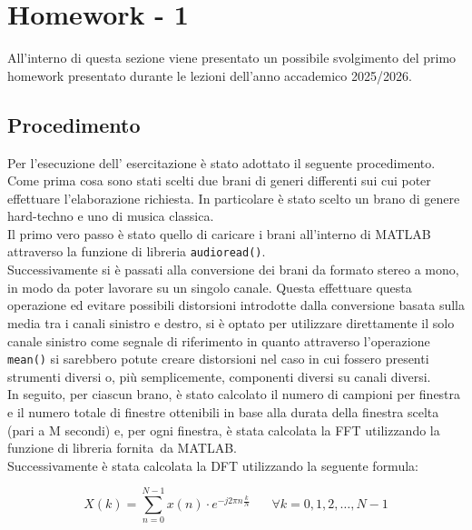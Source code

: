 \documentclass[../main.tex]{subfiles}
\begin{document}
\clearpage
\thispagestyle{empty}
\vspace*{7cm}
\section{Homework - 1}
\vspace*{1.5cm}

All'interno di questa sezione viene presentato un possibile svolgimento del primo homework presentato durante le lezioni dell'anno accademico 2025/2026.

\subsection{Procedimento}

Per l'esecuzione dell' esercitazione è stato adottato il seguente procedimento.
Come prima cosa sono stati scelti due brani di generi differenti sui cui poter effettuare l'elaborazione richiesta. In particolare è stato scelto un brano di genere hard-techno e uno di musica classica.\\

Il primo vero passo è stato quello di caricare i brani all'interno di MATLAB attraverso la funzione di libreria \texttt{audioread()}.\\

Successivamente si è passati alla conversione dei brani da formato stereo a mono, in modo da poter lavorare su un singolo canale. Questa effettuare questa operazione ed evitare possibili distorsioni introdotte dalla conversione basata sulla media tra i canali sinistro e destro, si è optato per utilizzare direttamente il solo canale sinistro come segnale di riferimento in quanto attraverso l’operazione \texttt{mean()} si sarebbero potute creare distorsioni nel caso in cui fossero presenti strumenti diversi o, più semplicemente, componenti diversi su canali diversi.\\

In seguito, per ciascun brano, è stato calcolato il numero di campioni per finestra e il numero totale di finestre ottenibili in base alla durata della finestra scelta (pari a M secondi) e, per ogni finestra, è stata calcolata la FFT utilizzando la funzione di libreria fornita da MATLAB.\\

Successivamente è stata calcolata la DFT utilizzando la seguente formula:

\[ X(k) = \sum_{n = 0}^{N-1} x(n) \cdot e^{-j2\pi n \frac{k}{N}} \hspace{20pt} \forall k = 0,1,2, \dots, N-1 \]\
\end{document}
